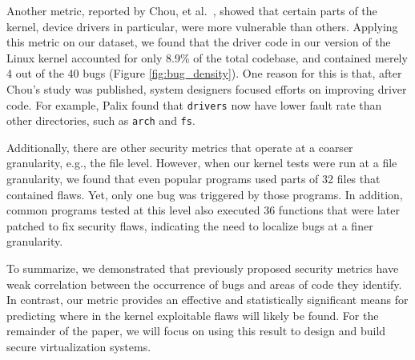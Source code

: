 Another metric, reported by Chou, et al.~\cite{PittSFIeld}, showed that certain parts of the kernel, 
device drivers in particular, were more vulnerable than others. 
Applying this metric on our dataset, we found that the driver code in our version
of the Linux kernel accounted for only 8.9\% of the total codebase, and contained
merely 4 out of the 40 bugs (Figure \ref{fig:bug_density}).
One reason for this is that, after Chou's study was published, system
designers focused efforts on improving driver code. For example, Palix \cite{palix2011faults}
found that %
\texttt{drivers} now have lower fault rate than other directories,
such as \texttt{arch} and \texttt{fs}.


Additionally, there are other security metrics that operate at a coarser granularity,
e.g., the file level. However, when our kernel tests were run at a file
granularity, we found that even popular programs used parts of %
32 files that contained flaws. Yet, only one bug was triggered by those programs.
In addition, common programs tested at this level also executed 36 functions
that were later patched to fix security
flaws, indicating the need to localize bugs at a finer granularity.

To summarize, we demonstrated that previously proposed security
metrics have weak correlation between the occurrence of bugs
and areas of code they identify. In contrast, our metric 
provides an effective and statistically significant
means for predicting where in the kernel exploitable flaws
will likely be found. For the remainder of the paper, we will
focus on using this result to design and build secure virtualization systems.
